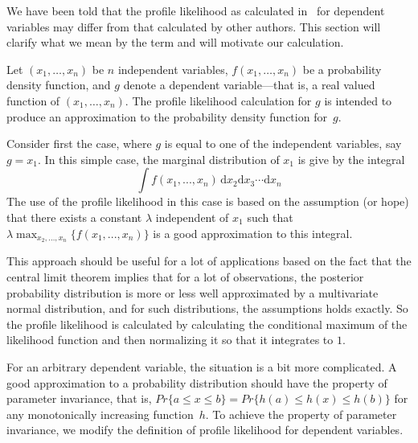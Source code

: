 \documentclass{admbmanual}
\begin{document}
We have been told that the profile likelihood as calculated in \ADM\ for
dependent variables may differ from that calculated by other authors. This
section will clarify what we mean by the term and will motivate our calculation.

Let $(x_1,\ldots,x_n)$ be $n$ independent variables, $f(x_1,\ldots,x_n)$ be a
probability density function, and $g$ denote a dependent variable---that is, a
real valued function of $(x_1,\ldots,x_n)$. The profile likelihood calculation
for $g$ is intended to produce an approximation to the probability density
function for~$g$.

Consider first the case, where $g$ is equal to one of the independent variables,
say $g=x_1$. In this simple case, the marginal distribution of $x_1$ is give by
the integral
\begin{equation}
  \int f(x_1,..., x_n)\, \textrm{d}x_2\textrm{d}x_3\cdots \textrm{d}x_n
\end{equation}
The use of the profile likelihood in this case is based on the assumption (or
hope) that there exists a constant $\lambda$ independent of $x_1$ such that
$\lambda \max_{x_2,\ldots,x_n} \{f(x_1,..., x_n)\}$ is a good approximation to
this integral.

This approach should be useful for a lot of applications based on the fact that
the central limit theorem implies that for a lot of observations, the posterior
probability distribution is more or less well approximated by a multivariate
normal distribution, and for such distributions, the assumptions holds exactly.
So the profile likelihood is calculated by calculating the conditional maximum
of the likelihood function and then normalizing it so that it integrates to $1$.

For an arbitrary dependent variable, the situation is a bit more complicated. A
good approximation to a probability distribution should have the property of
parameter invariance, that is, $Pr \{a\le x\le b\}=Pr \{h(a)\le h(x)\le h(b)\}$
for any monotonically increasing function~$h$. To achieve the property of
parameter invariance, we modify the definition of profile likelihood for
dependent variables.
\end{document}

